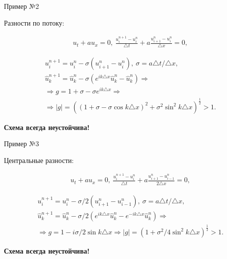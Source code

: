 \documentclass[10pt,xcolor=pst,aspectratio=169]{beamer}
\begin{document}
\begin{frame}{Пример №2}

	\transdissolve[duration=0.1]
	\justifying
	\large

	Разности по потоку:

	\[
		\begin{split}
			&u_{t} + a u_{x} = 0 , \: \frac{u^{n + 1}_{i} - u^{n}_{i}}{\triangle t} + a \frac{u^{n}_{i + 1} - u^{n}_{i}}{\triangle x} = 0,
		\end{split}
	\]

	\pause

	\[
		\begin{split}
			&u^{n + 1}_{i} = u^{n}_{i} - \sigma \left( u^{n}_{i + 1} - u^{n}_{i} \right), \: \sigma = a \triangle t / \triangle x, \\
			&\hat{u}^{n + 1}_{k} = \hat{u}^{n}_{k} - \sigma \left( e^{i k \triangle x} \hat{u}^{n}_{k} - \hat{u}^{n}_{k} \right) \Rightarrow \\
			& \Rightarrow g = 1 + \sigma - \sigma e^{i k \triangle x} \Rightarrow \\
			&\Rightarrow |g| = \left( \left( 1 + \sigma - \sigma \cos k \triangle x \right)^{2} + \sigma^2 \sin^{2} k \triangle x \right)^{\frac{1}{2}} > 1 .
		\end{split}
	\]

    \textbf{Схема всегда неустойчива!}\\

\end{frame}

\begin{frame}{Пример №3}

	\transdissolve[duration=0.1]
	\justifying
	\large

	Центральные разности:

	\[
		\begin{split}
			&u_{t} + a u_{x} = 0 , \: \frac{u^{n + 1}_{i} - u^{n}_{i}}{\triangle t} + a \frac{u^{n}_{i + 1} - u^{n}_{i - 1}}{2 \triangle x} = 0,
		\end{split}
	\]

	\pause

	\[
		\begin{split}
			&u^{n + 1}_{i} = u^{n}_{i} - \sigma / 2 \left( u^{n}_{i + 1} - u^{n}_{i - 1} \right), \: \sigma = a \triangle t / \triangle x, \\
			&\hat{u}^{n + 1}_{k} = \hat{u}^{n}_{k} - \sigma / 2 \left( e^{i k \triangle x} \hat{u}^{n}_{k} - e^{- i k \triangle x} \hat{u}^{n}_{k} \right) \Rightarrow \\
			& \Rightarrow g = 1 - i \sigma / 2 \sin k \triangle x \Rightarrow |g| = \left( 1 + \sigma^{2} / 4 \sin^{2} k \triangle x \right)^{\frac{1}{2}} > 1 .
		\end{split}
	\]

    \textbf{Схема всегда неустойчива!}\\

\end{frame}
\end{document}
